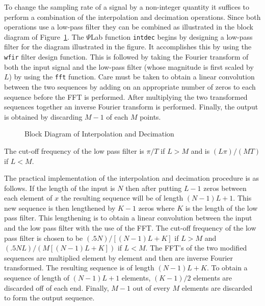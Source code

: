 	To change the sampling rate of a signal by a non-integer
quantity it suffices to perform a combination of the interpolation
and decimation operations.  Since both operations use a low-pass filter they
can be combined as illustrated in the block diagram of Figure~\ref{f44.1}.
The $\Psi$Lab function {\tt intdec} begins by designing a low-pass filter for the 
diagram illustrated in the figure.  It accomplishes this by using
the {\tt wfir} filter design function.  This is followed by taking the
Fourier transform of both the input signal and the low-pass filter
(whose magnitude is first scaled by $L$)
by using the {\tt fft} function.  Care must be taken to obtain a linear
convolution between the two sequences by adding on an appropriate number
of zeros to each sequence before the FFT is performed.  After multiplying
the two transformed sequences together an inverse Fourier transform
is performed.  Finally, the output is obtained by discarding $M-1$
of each $M$ points.
%
\begin{figure}[tb]
\caption{ Block Diagram of Interpolation and Decimation}
\label{f44.1}
\end{figure}
%
The cut-off frequency of the low pass filter is $\pi/T$
if $L>M$ and is $(L\pi)/(MT)$ if $L<M$.

	The practical implementation of the interpolation and decimation
procedure is as follows.
If the length of the input is $N$ then after putting $L-1$ zeros
between each element of $x$ the resulting sequence will be of length
$(N-1)L+1$.  This new sequence is then lengthened by $K-1$ zeros
where $K$ is the length of the low pass filter.  This lengthening is
to obtain a linear convolution between the input and the low pass
filter with the use of the FFT.  The cut-off frequency
of the low pass filter is chosen to be $(.5N)/[(N-1)L+K]$ if $L>M$
and $(.5NL)/(M[(N-1)L+K])$ if $L<M$.  
The FFT's of the two modified sequences are multiplied
element by element and then are inverse Fourier transformed.
The resulting sequence is of length $(N-1)L+K$.  To obtain a
sequence of length of $(N-1)L+1$ elements, $(K-1)/2$ elements
are discarded off of each end.  Finally, $M-1$ out of every
$M$ elements are discarded to form the output sequence.

